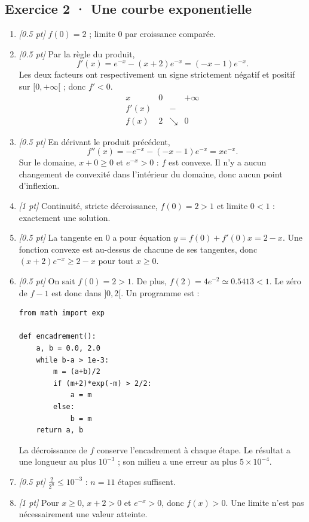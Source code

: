 \subsection*{Exercice 2 · Une courbe exponentielle}\begin{enumerate}

\item \textit{[\num{0,5} pt]} $f(0)=2$ ; limite $0$ par croissance comparée.

\item \textit{[\num{0,5} pt]} Par la règle du produit,
\[f'(x)=e^{-x}-(x+2)e^{-x}=(-x-1)e^{-x}.\]
Les deux facteurs ont respectivement un signe strictement négatif et positif sur $[0,+\infty[$ ; donc $f'<0$.
\[\begin{array}{c|ccc}x&0&&+\infty\\\hline f'(x)&&-&\\\hline f(x)&2&\searrow&0\end{array}\]

\item \textit{[\num{0,5} pt]} En dérivant le produit précédent,
\[f''(x)=-e^{-x}-(-x-1)e^{-x}=xe^{-x}.\]
Sur le domaine, $x+0\ge0$ et $e^{-x}>0$ : $f$ est convexe. Il n'y a aucun changement de convexité dans l'intérieur du domaine, donc aucun point d'inflexion.

\item \textit{[1 pt]} Continuité, stricte décroissance, $f(0)=2>1$ et limite $0<1$ : exactement une solution.

\item \textit{[\num{0,5} pt]} La tangente en $0$ a pour équation $y=f(0)+f'(0)x=2-x$. Une fonction convexe est au-dessus de chacune de ses tangentes, donc $(x+2)e^{-x}\ge 2-x$ pour tout $x\ge0$.


\item \textit{[\num{0,5} pt]} On sait $f(0)=2>1$. De plus, $f(2)=4e^{-2}\simeq\num{0,5413}<1$. Le zéro de $f-1$ est donc dans $]0,2[$. Un programme est :
\begin{lstlisting}
from math import exp

def encadrement():
    a, b = 0.0, 2.0
    while b-a > 1e-3:
        m = (a+b)/2
        if (m+2)*exp(-m) > 2/2:
            a = m
        else:
            b = m
    return a, b
\end{lstlisting}
La décroissance de $f$ conserve l'encadrement à chaque étape. Le résultat a une longueur au plus $10^{-3}$ ; son milieu a une erreur au plus $5\times10^{-4}$.

\item \textit{[\num{0,5} pt]} $\frac{2}{2^n}\le10^{-3}$ : $n=11$ étapes suffisent.

\item \textit{[1 pt]} Pour $x\ge0$, $x+2>0$ et $e^{-x}>0$, donc $f(x)>0$. Une limite n'est pas nécessairement une valeur atteinte.

\end{enumerate}

